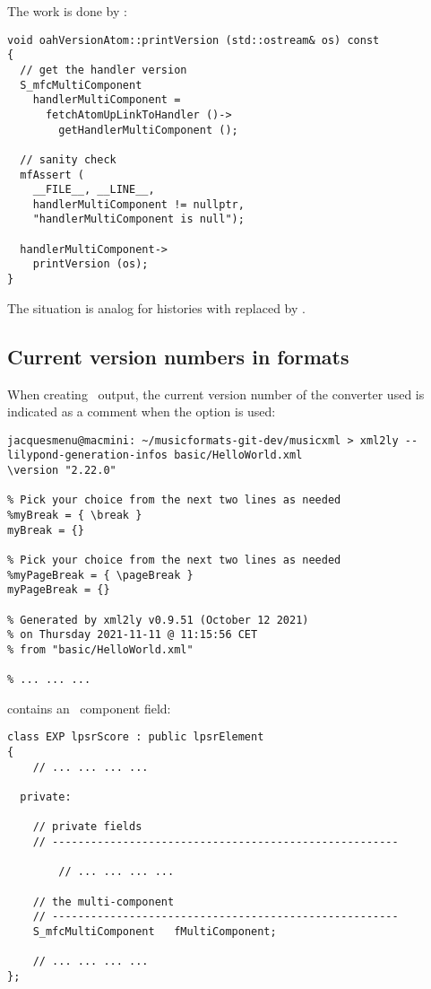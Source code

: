 The work is done by :
\begin{lstlisting}[language=CPlusPlus]
void oahVersionAtom::printVersion (std::ostream& os) const
{
  // get the handler version
  S_mfcMultiComponent
    handlerMultiComponent =
      fetchAtomUpLinkToHandler ()->
        getHandlerMultiComponent ();

  // sanity check
  mfAssert (
    __FILE__, __LINE__,
    handlerMultiComponent != nullptr,
    "handlerMultiComponent is null");

  handlerMultiComponent->
    printVersion (os);
}
\end{lstlisting}

The situation is analog for histories with  replaced by .


\subsection{Current version numbers in formats}\label{Current version numbers in formats}

When creating \lily\ output, the current version number of the converter used is indicated as a comment when the  option is used:
\begin{lstlisting}[language=Terminal]
jacquesmenu@macmini: ~/musicformats-git-dev/musicxml > xml2ly --lilypond-generation-infos basic/HelloWorld.xml
\version "2.22.0"

% Pick your choice from the next two lines as needed
%myBreak = { \break }
myBreak = {}

% Pick your choice from the next two lines as needed
%myPageBreak = { \pageBreak }
myPageBreak = {}

% Generated by xml2ly v0.9.51 (October 12 2021)
% on Thursday 2021-11-11 @ 11:15:56 CET
% from "basic/HelloWorld.xml"

% ... ... ...
\end{lstlisting}

 contains an \mfcRepr\ component field:
\begin{lstlisting}[language=CPlusPlus]
class EXP lpsrScore : public lpsrElement
{
 	// ... ... ... ...

  private:

    // private fields
    // ------------------------------------------------------

	 	// ... ... ... ...

    // the multi-component
    // ------------------------------------------------------
    S_mfcMultiComponent   fMultiComponent;

 	// ... ... ... ...
};
\end{lstlisting}

